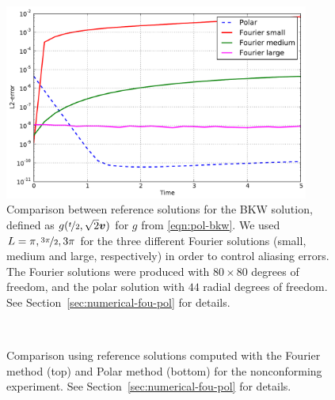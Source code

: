 \begin{figure}
    \centering
    \includegraphics[width=10cm]{figs/polboltz/compare-bkw}
    \caption{Comparison between reference solutions for the BKW solution, defined as $g(\nicefrac{t}{2},
    \sqrt{2}{\bm v})$ for $g$ from \eqref{eqn:pol-bkw}. We used $L=\pi, \nicefrac{3\pi}{2}, 3\pi$ for
    the three different Fourier solutions (small, medium and large, respectively) in order to control aliasing
    errors. The Fourier solutions were produced with $80\times80$ degrees of freedom, and the polar solution
    with $44$ radial degrees of freedom. See Section~\vref{sec:numerical-fou-pol} for details.}
    \label{fig:numpol-comp-bkw}
\end{figure}

\begin{figure}
\centering
{} \\
\caption{Comparison using reference solutions computed with the Fourier method (top) and Polar method (bottom)
for the nonconforming experiment. See Section~\vref{sec:numerical-fou-pol} for details.}
\label{fig:numpol-comp2}
\end{figure}
